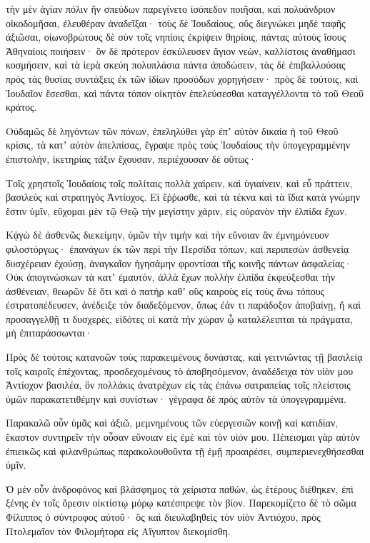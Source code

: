 {τὴν μὲν ἁγίαν πόλιν ἣν σπεύδων παρεγίνετο ἰσόπεδον ποιῆσαι, καὶ πολυάνδριον οἰκοδομῆσαι, ἐλευθέραν ἀναδεῖξαι·
τοὺς δὲ Ἰουδαίους, οὕς διεγνώκει μηδὲ ταφῆς ἀξιῶσαι, οἰωνοβρώτους δὲ σὺν τοῖς νηπίοις ἐκρίψειν θηρίοις, πάντας αὐτοὺς ἴσους Ἀθηναίοις ποιήσειν·
ὃν δὲ πρότερον ἐσκύλευσεν ἅγιον νεὼν, καλλίστοις ἀναθήμασι κοσμήσειν, καὶ τὰ ἱερὰ σκεύη πολυπλάσια πάντα ἀποδώσειν, τὰς δὲ ἐπιβαλλούσας πρὸς τὰς θυσίας συντάξεις ἐκ τῶν ἰδίων προσόδων χορηγήσειν·
πρὸς δὲ τούτοις, καὶ Ἰουδαῖον ἔσεσθαι, καὶ πάντα τόπον οἰκητὸν ἐπελεύσεσθαι καταγγέλλοντα τὸ τοῦ Θεοῦ κράτος.
\par }{\PP {}Οὐδαμῶς δὲ ληγόντων τῶν πόνων, ἐπεληλύθει γὰρ ἐπʼ αὐτὸν δικαία ἡ τοῦ Θεοῦ κρίσις, τὰ κατʼ αὐτὸν ἀπελπίσας, ἔγραψε πρὸς τοὺς Ἰουδαίους τὴν ὑπογεγραμμένην ἐπιστολήν, ἱκετηρίας τάξιν ἔχουσαν, περιέχουσαν δὲ οὕτως·
\par }{\PP {}Τοῖς χρηστοῖς Ἰουδαίοις τοῖς πολίταις πολλὰ χαίρειν, καὶ ὑγιαίνειν, καὶ εὖ πράττειν, βασιλεὺς καὶ στρατηγὸς Ἀντίοχος.
Εἰ ἔῤῥωσθε, καὶ τὰ τέκνα καὶ τὰ ἴδια κατὰ γνώμην ἔστιν ὑμῖν, εὔχομαι μὲν τῷ Θεῷ τὴν μεγίστην χάριν, εἰς οὐρανὸν τὴν ἐλπίδα ἔχων.
\par }{\PP {}Κᾀγὼ δὲ ἀσθενῶς διεκείμην, ὑμῶν τὴν τιμὴν καὶ τὴν εὔνοιαν ἄν ἐμνημόνευον φιλοστόργως· ἐπανάγων ἐκ τῶν περὶ τὴν Περσίδα τόπων, καὶ περιπεσὼν ἀσθενείᾳ δυσχέρειαν ἐχούσῃ, ἀναγκαῖον ἡγησάμην φροντίσαι τῆς κοινῆς πάντων ἀσφαλείας·
Οὐκ ἀπογινώσκων τὰ κατʼ ἐμαυτόν, ἀλλὰ ἔχων πολλὴν ἐλπίδα ἐκφεύξεσθαι τὴν ἀσθένειαν,
θεωρῶν δὲ ὅτι καὶ ὁ πατήρ καθʼ οὓς καιροὺς εἰς τοὺς ἄνω τόπους ἐστρατοπέδευσεν, ἀνέδειξε τὸν διαδεξόμενον,
ὅπως ἐάν τι παράδοξον ἀποβαίνῃ, ἤ καὶ προσαγγελθῇ τι δυσχερὲς, εἰδότες οἱ κατὰ τὴν χώραν ᾧ καταλέλειπται τὰ πράγματα, μὴ ἐπιταράσσωνται·
\par }{\PP {}Πρὸς δὲ τούτοις κατανοῶν τοὺς παρακειμένους δυνάστας, καὶ γειτνιῶντας τῇ βασιλείᾳ τοῖς καιροῖς ἐπέχοντας, προσδεχομένους τὸ ἀποβησόμενον, ἀναδέδειχα τὸν υἱὸν μου Ἀντίοχον βασιλέα, ὃν πολλάκις ἀνατρέχων εἰς τὰς ἐπάνω σατραπείας τοῖς πλείστοις ὑμῶν παρακατετιθέμην καὶ συνίστων· γέγραφα δὲ πρὸς αὐτὸν τὰ ὑπογεγραμμένα.
\par }{\PP {}Παρακαλῶ οὖν ὑμᾶς καὶ ἀξιῶ, μεμνημένους τῶν εὐεργεσιῶν κοινῇ καὶ κατιδίαν, ἕκαστον συντηρεῖν τὴν οὖσαν εὔνοιαν εἰς ἐμὲ καὶ τὸν υἱόν μου.
Πέπεισμαι γὰρ αὐτὸν ἐπιεικῶς καὶ φιλανθρώπως παρακολουθοῦντα τῇ ἐμῇ προαιρέσει, συμπεριενεχθήσεσθαι ὑμῖν.
\par }{\PP {}Ὁ μὲν οὖν ἀνδροφόνος καὶ βλάσφημος τὰ χείριστα παθών, ὡς ἑτέρους διέθηκεν, ἐπὶ ξένης ἐν τοῖς ὄρεσιν οἰκτίστῳ μόρῳ κατέσπρεψε τὸν βίον.
Παρεκομίζετο δὲ τὸ σῶμα Φίλιππος ὁ σύντροφος αὐτοῦ· ὃς καὶ διευλαβηθεὶς τὸν υἱὸν Ἀντιόχου, πρὸς Πτολεμαῖον τὸν Φιλομήτορα εἰς Αἴγυπτον διεκομίσθη.

}
